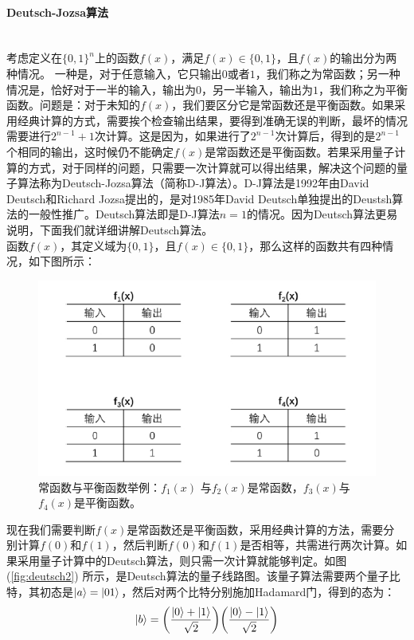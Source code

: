 \documentclass[a4paper]{article}
\begin{document}
\paragraph{Deutsch-Jozsa算法}~\\
考虑定义在$ \{0,1\}^n $上的函数$ f(x) $，满足$ f(x)\in \{0, 1\} $，且$ f(x) $的输出分为两种情况。
一种是，对于任意输入，它只输出$ 0 $或者$ 1$，我们称之为常函数；另一种情况是，恰好对于一半的输入，输出为$ 0 $，另一半输入，输出为$ 1 $，我们称之为平衡函数。问题是：对于未知的$ f(x) $，我们要区分它是常函数还是平衡函数。如果采用经典计算的方式，需要挨个检查输出结果，要得到准确无误的判断，最坏的情况需要进行$ 2^{n-1} + 1  $次计算。这是因为，如果进行了$ 2^{n-1} $次计算后，得到的是$ 2^{n-1} $个相同的输出，这时候仍不能确定$ f(x)  $是常函数还是平衡函数。若果采用量子计算的方式，对于同样的问题，只需要一次计算就可以得出结果，解决这个问题的量子算法称为Deutsch-Jozsa算法（简称D-J算法）。D-J算法是1992年由David Deutsch和Richard Jozsa提出的，是对1985年David Deutsch单独提出的Deustsh算法的一般性推广。Deutsch算法即是D-J算法$ n=1  $的情况。因为Deutsch算法更易说明，下面我们就详细讲解Deutsch算法。\\
函数$ f(x) $，其定义域为$ \{0,1\} $，且$ f(x)\in\{0,1\} $，那么这样的函数共有四种情况，如下图所示：
\begin{figure}[H]
	\centering
	\includegraphics[width=0.65\linewidth]{fig/deutsch.jpg}
	\caption{常函数与平衡函数举例：$ f_1(x) $ 与$ f_2(x)  $是常函数，$ f_3(x) $与$ f_4(x) $是平衡函数。}
	\label{fig:deutsch}
\end{figure}
现在我们需要判断$ f(x)  $是常函数还是平衡函数，采用经典计算的方法，需要分
别计算$ f(0)  $和$ f(1) $，然后判断$ f(0)  $和$ f(1)  $是否相等，共需进行两次计算。如果采用量子计算中的Deutsch算法，则只需一次计算就能够判定。如图 (\ref{fig:deutsch2}) 所示，是Deutsch算法的量子线路图。该量子算法需要两个量子比特，其初态是$ \ket{a} = \ket{01} $，然后对两个比特分别施加Hadamard门，得到的态为：
\begin{equation}\label{key}
\ket{b} = \qty(\dfrac{\ket{0} + \ket{1}}{\sqrt{2}}) \qty(\dfrac{\ket{0} - \ket{1}}{\sqrt{2}})
\end{equation}
\end{document}
